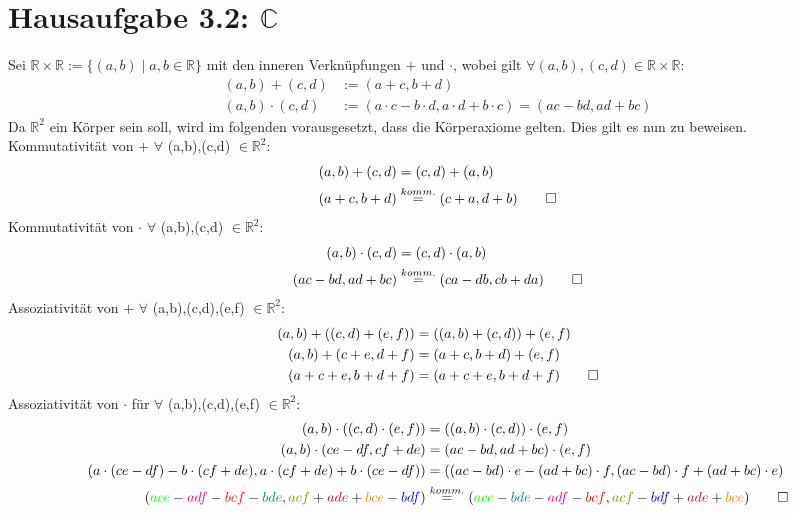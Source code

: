 \documentclass[titlepage]{article}
\begin{document}
	\section*{Hausaufgabe 3.2: $\mathbb{C}$}
		Sei $\mathbb{R}\times\mathbb{R}:=\{(a,b)\mid a,b\in \mathbb{R}\}$ mit den inneren Verknüpfungen $+$ und $\cdot$, wobei gilt $\forall (a,b),(c,d)\in \mathbb{R}\times \mathbb{R}$:
		\begin{align*}
			(a,b)+(c,d) &:= (a+c,b+d)\\
			(a,b)\cdot (c,d) &:= (a\cdot c-b\cdot d,a\cdot d+b\cdot c) = (ac-bd,ad+bc)
		\end{align*}
	Da $\mathbb{R}^2$ ein Körper sein soll, wird im folgenden vorausgesetzt, dass die Körperaxiome gelten. Dies gilt es nun zu beweisen.\\
	Kommutativität von + $\forall$ (a,b),(c,d) $\in \mathbb{R}^2$:
	\begin{align*}
		(a,b)+(c,d) &= (c,d)+(a,b)\\
		(a+c,b+d) &\overset{komm.}{=} (c+a,d+b) \qed
	\end{align*}
	Kommutativität von $\cdot$  $\forall$ (a,b),(c,d) $\in \mathbb{R}^2$:
	\begin{align*}
		(a,b)\cdot(c,d) &= (c,d)\cdot(a,b)\\
		(ac-bd,ad+bc) &\overset{komm.}{=} (ca-db,cb+da) \qed
	\end{align*}
	Assoziativität von + $\forall$ (a,b),(c,d),(e,f) $\in \mathbb{R}^2$:
	\begin{align*}
		(a,b)+((c,d)+(e,f)) &= ((a,b)+(c,d))+(e,f)\\
		(a,b)+(c+e,d+f) &= (a+c,b+d)+(e,f)\\
		(a+c+e,b+d+f) &= (a+c+e,b+d+f) \qed
	\end{align*}
	Assoziativität von $\cdot$ für $\forall$ (a,b),(c,d),(e,f) $\in \mathbb{R}^2$:
	\begin{align*}
		(a,b)\cdot((c,d)\cdot(e,f)) &= ((a,b)\cdot(c,d))\cdot(e,f)\\
		(a,b)\cdot(ce-df,cf+de) &= (ac-bd,ad+bc)\cdot(e,f)\\
		(a\cdot(ce-df)-b\cdot(cf+de),a\cdot(cf+de)+b\cdot(ce-df)) &= ((ac-bd)\cdot e-(ad+bc)\cdot f,(ac-bd)\cdot f+(ad+bc)\cdot e)\\
		(\textcolor{green}{ace}-\textcolor{magenta}{adf}-\textcolor{red}{bcf}-\textcolor{teal}{bde},\textcolor{olive}{acf}+\textcolor{purple}{ade}+\textcolor{orange}{bce}-\textcolor{blue}{bdf}) &\overset{komm.}{=} (\textcolor{green}{ace}-\textcolor{teal}{bde}-\textcolor{magenta}{adf}-\textcolor{red}{bcf},\textcolor{olive}{acf}-\textcolor{blue}{bdf}+\textcolor{purple}{ade}+\textcolor{orange}{bce}) \qed
	\end{align*}
\end{document}
